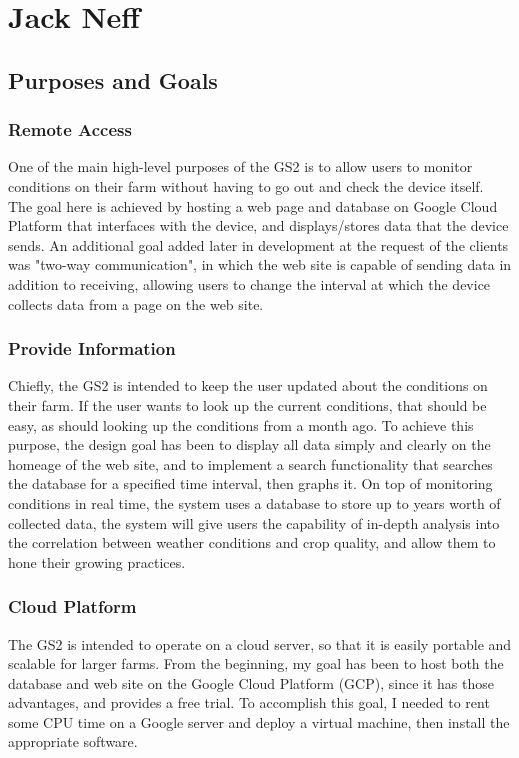 \documentclass[IEEEtran,letterpaper,10pt,titlepage,fleqn,draftclsnofoot,onecolumn]{article}
\begin{document}
\section{Jack Neff}

\subsection{Purposes and Goals}

\subsubsection{Remote Access}
One of the main high-level purposes of the GS2 is to allow users to monitor conditions on their farm without having to go out and check the device itself. The goal here is achieved by hosting a web page and database on Google Cloud Platform that interfaces with the device, and displays/stores data that the device sends. An additional goal added later in development at the request of the clients was "two-way communication", in which the web site is capable of sending data in addition to receiving, allowing users to change the interval at which the device collects data from a page on the web site.

\subsubsection{Provide Information}

Chiefly, the GS2 is intended to keep the user updated about the conditions on their farm. If the user wants to look up the current conditions, that should be easy, as should looking up the conditions from a month ago. To achieve this purpose, the design goal has been to display all data simply and clearly on the homeage of the web site, and to implement a search functionality that searches the database for a specified time interval, then graphs it. On top of monitoring conditions in real time, the system uses a database to store up to years worth of collected data, the system will give users the capability of in-depth analysis into the correlation between weather conditions and crop quality, and allow them to hone their growing practices. 

\subsubsection{Cloud Platform}

The GS2 is intended to operate on a cloud server, so that it is easily portable and scalable for larger farms. From the beginning, my goal has been to host both the database and web site on the Google Cloud Platform (GCP), since it has those advantages, and provides a free trial. To accomplish this goal, I needed to rent some CPU time on a Google server and deploy a virtual machine, then install the appropriate software. 
\end{document}

